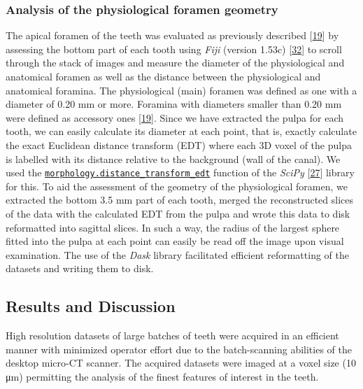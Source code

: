 \documentclass[
  american,
]{article}
\begin{document}
\hypertarget{analysis-of-the-physiological-foramen-geometry}{%
\subsubsection{Analysis of the physiological foramen geometry}\label{analysis-of-the-physiological-foramen-geometry}}

The apical foramen of the teeth was evaluated as previously described {[}\protect\hyperlink{ref-1Gn1pVZXt}{19}{]} by assessing the bottom part of each tooth using \emph{Fiji} (version 1.53c) {[}\protect\hyperlink{ref-Fkmz2cmo}{32}{]} to scroll through the stack of images and measure the diameter of the physiological and anatomical foramen as well as the distance between the physiological and anatomical foramina.
The physiological (main) foramen was defined as one with a diameter of 0.20 mm or more.
Foramina with diameters smaller than 0.20 mm were defined as accessory ones {[}\protect\hyperlink{ref-1Gn1pVZXt}{19}{]}.
Since we have extracted the pulpa for each tooth, we can easily calculate its diameter at each point, that is, exactly calculate the exact Euclidean distance transform (EDT) where each 3D voxel of the pulpa is labelled with its distance relative to the background (wall of the canal).
We used the \href{https://docs.scipy.org/doc/scipy-0.14.0/reference/generated/scipy.ndimage.morphology.distance_transform_edt.html}{\texttt{morphology.distance\_transform\_edt}} function of the \emph{SciPy} {[}\protect\hyperlink{ref-8Miti2Gz}{27}{]} library for this.
To aid the assessment of the geometry of the physiological foramen, we extracted the bottom 3.5 mm part of each tooth, merged the reconstructed slices of the data with the calculated EDT from the pulpa and wrote this data to disk reformatted into sagittal
slices.
In such a way, the radius of the largest sphere fitted into the pulpa at each point can easily be read off the image upon visual examination.
The use of the \emph{Dask} library facilitated efficient reformatting of the datasets and writing them to disk.

\hypertarget{results-and-discussion}{%
\subsection{Results and Discussion}\label{results-and-discussion}}

High resolution datasets of large batches of teeth were acquired in an efficient manner with minimized operator effort due to the batch-scanning abilities of the desktop micro-CT scanner.
The acquired datasets were imaged at a voxel size (10 μm) permitting the analysis of the finest features of interest in the teeth.
\end{document}
